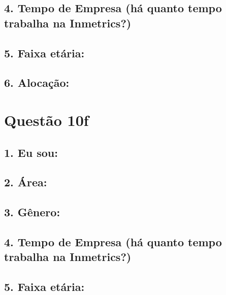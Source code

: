 \documentclass[]{book}
\begin{document}
\hypertarget{tempo-de-empresa-ha-quanto-tempo-trabalha-na-inmetrics-6}{%
\subsection{4. Tempo de Empresa (há quanto tempo trabalha na Inmetrics?)}\label{tempo-de-empresa-ha-quanto-tempo-trabalha-na-inmetrics-6}}

\hypertarget{faixa-etaria-6}{%
\subsection{5. Faixa etária:}\label{faixa-etaria-6}}

\hypertarget{alocacao-6}{%
\subsection{6. Alocação:}\label{alocacao-6}}

\hypertarget{questao-10f}{%
\section{Questão 10f}\label{questao-10f}}

\hypertarget{eu-sou-7}{%
\subsection{1. Eu sou:}\label{eu-sou-7}}

\hypertarget{area-7}{%
\subsection{2. Área:}\label{area-7}}

\hypertarget{genero-7}{%
\subsection{3. Gênero:}\label{genero-7}}

\hypertarget{tempo-de-empresa-ha-quanto-tempo-trabalha-na-inmetrics-7}{%
\subsection{4. Tempo de Empresa (há quanto tempo trabalha na Inmetrics?)}\label{tempo-de-empresa-ha-quanto-tempo-trabalha-na-inmetrics-7}}

\hypertarget{faixa-etaria-7}{%
\subsection{5. Faixa etária:}\label{faixa-etaria-7}}
\end{document}
